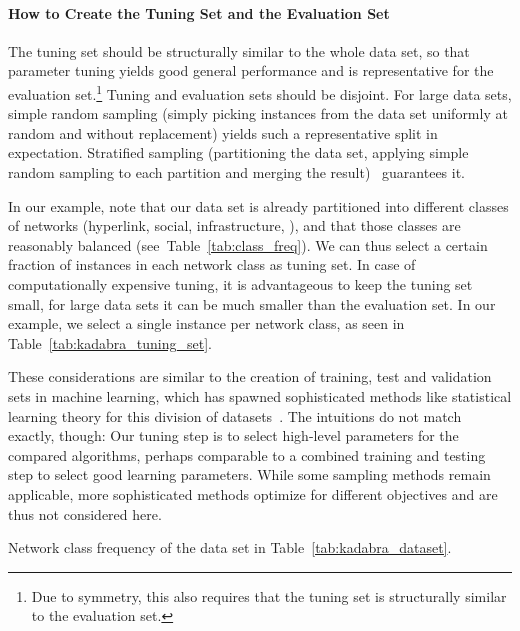 \documentclass[algorithms,article,submit,moreauthors,pdftex]{Definitions/mdpi}
\newcommand{\changed}[1]{#1}
\begin{document}
\paragraph{How to Create the Tuning Set and the Evaluation Set}
The tuning set should be structurally similar to the whole data set, so that parameter tuning yields good general performance and is representative for the evaluation set.\footnote{Due to symmetry, this also requires that the tuning set is structurally similar to the evaluation set.}
Tuning and evaluation sets should be disjoint.
For large data sets, simple random sampling (\ie simply picking instances from the data set uniformly at random and without replacement) yields such a representative split in expectation.
Stratified sampling (\ie partitioning the data set, applying simple random sampling to each partition and merging the result)~\cite{tibshirani2013introduction} guarantees it.

In our example, note that our data set is already partitioned into different classes of networks (hyperlink, social, infrastructure, \etc), and that those classes are \changed{reasonably} balanced (see~Table~\ref{tab:class_freq}).
We can thus select a certain fraction of instances in each network class as tuning set.
%
In case of computationally expensive tuning, it is advantageous to keep the tuning set small, for large data sets it can be much smaller than the evaluation set.
In our example, we select a single instance per network class, as seen in Table~\ref{tab:kadabra_tuning_set}.

\changed{These considerations are similar to the creation of training, test and validation sets in machine learning, which has spawned sophisticated methods like statistical learning theory for this division of datasets~\cite{hinton2012practical, larochelle2007empirical, lecun1998gradient}.
The intuitions do not match exactly, though: Our tuning step is to select high-level parameters for the compared algorithms, perhaps comparable to a combined training and testing step to select good learning parameters. While some sampling methods remain applicable, more sophisticated methods optimize for different objectives and are thus not considered here.}

\begin{table}
\centering
\caption{Network class frequency of the data set in Table~\ref{tab:kadabra_dataset}.}
\label{tab:class_freq}

\end{table}
\end{document}
